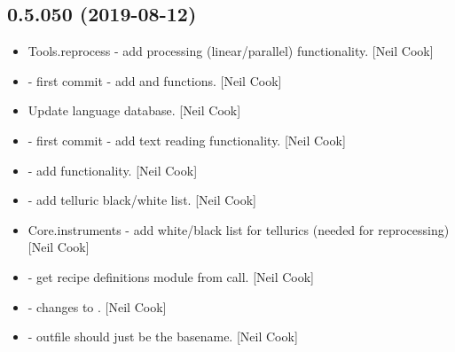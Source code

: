 \documentclass[a4paper,10pt,english]{report}
\begin{document}
\subsection{0.5.050 (2019-08-12)}
\label{\detokenize{misc/changelog:id92}}\begin{itemize}
\item {} 
Tools.reprocess - add processing (linear/parallel) functionality.
{[}Neil Cook{]}

\item {} 
 - first commit - add  and
 functions. {[}Neil Cook{]}

\item {} 
Update language database. {[}Neil Cook{]}

\item {} 
 - first commit - add text reading functionality. {[}Neil
Cook{]}

\item {} 
 - add  functionality. {[}Neil Cook{]}

\item {} 
 - add telluric black/white list. {[}Neil
Cook{]}

\item {} 
Core.instruments - add white/black list for tellurics (needed for
reprocessing) {[}Neil Cook{]}

\item {} 
 - get recipe definitions module from call.
{[}Neil Cook{]}

\item {} 
 - changes to . {[}Neil Cook{]}

\item {} 
 - outfile should just be the basename. {[}Neil
Cook{]}

\end{itemize}
\end{document}
